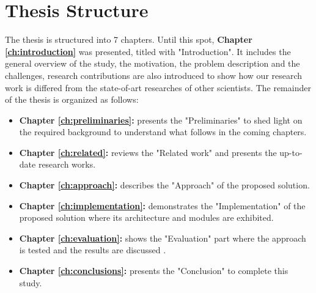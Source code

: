 \section {Thesis Structure}
The thesis is structured into 7 chapters. Until this spot, \textbf{Chapter \ref{ch:introduction}} was presented, titled with "Introduction". It  includes the general overview of the study, the motivation, the problem description and the challenges, research contributions are also introduced to show how our research work is differed from the state-of-art researches of other scientists. The
remainder of the thesis is organized as follows:
\begin{itemize}
	\item { \textbf{Chapter \ref{ch:preliminaries}:} presents the "Preliminaries" to shed light on the required background to understand what follows in the coming chapters.}
	
	\item {\textbf{Chapter \ref{ch:related}:}} reviews the "Related work" and presents the up-to-date research works. 
		
	\item {\textbf{Chapter \ref{ch:approach}:}} describes the "Approach" of the proposed solution. 
	
	\item {\textbf{Chapter \ref{ch:implementation}:}} demonstrates the "Implementation" of the proposed solution where its architecture and modules are exhibited.
	
	\item {\textbf{Chapter \ref{ch:evaluation}:}} shows the "Evaluation" part where the approach is tested and the results are discussed .

	\item {\textbf{Chapter \ref{ch:conclusions}:}} presents the "Conclusion" to complete this study.
\end{itemize}






